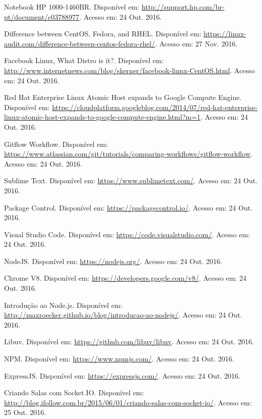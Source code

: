 \documentclass[brazil,ruledheader]{abntifes}
\begin{document}
\begin{thebibliography}{9}
		Notebook HP 1000-1460BR. Disponível em: \url{http://support.hp.com/br-pt/document/c03788977}.
		Acesso em: 24 Out. 2016.
		
		Difference between CentOS, Fedora, and RHEL. Disponível em: \url{https://linux-audit.com/difference-between-centos-fedora-rhel/}.
		Acesso em: 27 Nov. 2016.
		
		Facebook Linux, What Distro is it?. Disponível em: \url{http://www.internetnews.com/blog/skerner/facebook-linux-CentOS.html}.
		Acesso em: 24 Out. 2016.
		
		Red Hat Enterprise Linux Atomic Host expands to Google Compute Engine. Disponível em: \url{https://cloudplatform.googleblog.com/2014/07/red-hat-enterprise-linux-atomic-host-expands-to-google-compute-engine.html?m=1}.
		Acesso em: 24 Out. 2016.
		
		Gitflow Workflow. Disponível em: \url{https://www.atlassian.com/git/tutorials/comparing-workflows/gitflow-workflow}.
		Acesso em: 24 Out. 2016.
		
		Sublime Text. Disponível em: \url{https://www.sublimetext.com/}.
		Acesso em: 24 Out. 2016.
		
		Package Control. Disponível em: \url{https://packagecontrol.io/}.
		Acesso em: 24 Out. 2016.
		
		Visual Studio Code. Disponível em: \url{https://code.visualstudio.com/}.
		Acesso em: 24 Out. 2016.
		
		NodeJS. Disponível em: \url{https://nodejs.org/}.
		Acesso em: 24 Out. 2016.
		
		Chrome V8. Disponível em: \url{https://developers.google.com/v8/}.
		Acesso em: 24 Out. 2016.
		
		Introdução ao Node.js. Disponível em: \url{http://maxroecker.github.io/blog/introducao-ao-nodejs/}.
		Acesso em: 24 Out. 2016.
		
		Libuv. Disponível em: \url{https://github.com/libuv/libuv}.
		Acesso em: 24 Out. 2016.
		
		NPM. Disponível em: \url{https://www.npmjs.com/}.
		Acesso em: 24 Out. 2016.
		
		ExpressJS. Disponível em: \url{https://expressjs.com/}.
		Acesso em: 24 Out. 2016.
		
		Criando Salas com Socket.IO. Disponível em: \url{http://blog.ifollow.com.br/2015/06/01/criando-salas-com-socket-io/}.
		Acesso em: 25 Out. 2016.
		

\end{thebibliography}
\end{document}
